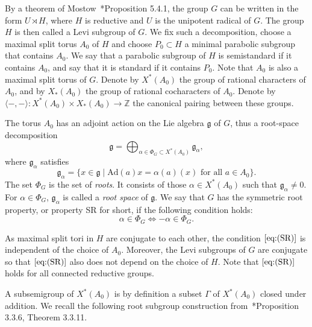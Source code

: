 \documentclass[letterpaper,11pt]{amsart}
\newcommand{\fg}{\mathfrak{g}}
\newcommand{\Z}{\mathbb{Z}}
\newcommand{\<}{\negthickspace}
\theoremstyle{definition}
\theoremstyle{plain}
\theoremstyle{remark}
\numberwithin{equation}{section}
\begin{document}
By a theorem of Mostow~\cite{Conrad}*{Proposition 5.4.1}, the group $G$ can
be written in the form $ U \rtimes H$, where $H$ is reductive and $U$ is the
unipotent radical of $G$. The group $H$ is then called a Levi subgroup of $G$. We fix such a decomposition, choose a maximal split
torus $A_0$ of $H$ and choose $P_0 \subset H$ a minimal parabolic subgroup
that contains $A_0$. We say that a parabolic subgroup of $H$ is semistandard if it
contains $A_0$, and say that it is standard if it contains $P_0$. Note that $A_0$ is
also a maximal split torus of $G$. Denote by $X^*(A_0)$ the group of rational characters of $A_0$, and by $X_*(A_0)$ the group of rational cocharacters of $A_0$. Denote by $\langle -,- \rangle : X^*(A_0) \times X_*(A_0) \to \Z$ the canonical pairing between these groups.

The torus $A_0$ has an adjoint action on the Lie algebra $\fg$ of $G$, thus a
root-space decomposition
    \[
    \fg =
    \bigoplus_{\alpha \in \Phi_G \subset X^*(A_0)} \fg_\alpha,
    \]
where $\fg_\alpha$ satisfies
    \[
    \fg_\alpha = \{ x \in \fg \mid \mathrm{Ad}(a) x
    = \alpha(a)(x) \text{ for all }a \in A_0 \}.
    \]
The set $\Phi_G$ is the set of \emph{roots}. It consists of those $\alpha \in X^*(A_0)$ such that $\fg_\alpha
\ne 0$. For $\alpha \in \Phi_G$, $\fg_\alpha$ is called a \emph{root space} of $\fg$. We say that $G$ has the symmetric root property, or property SR for short, if
the following condition holds:
    \begin{equation} \tag{SR} \label{eq:(SR)}
         \alpha \in \Phi_G  \iff -\alpha \in \Phi_G.
    \end{equation}

As maximal split tori in $H$ are conjugate to each other, the condition
$\eqref{eq:(SR)}$ is independent of the choice of $A_0$. Moreover, the Levi subgroups of $G$ are conjugate so that $\eqref{eq:(SR)}$ also does not depend on the choice of $H$. Note that $\eqref{eq:(SR)}$ holds for all connected reductive groups.

A subsemigroup of $X^*(A_0)$ is by definition a subset $\Gamma$ of $X^*(A_0)$ closed under
addition. We recall the following root subgroup construction
from~\cite{CGP}*{Proposition 3.3.6, Theorem 3.3.11}.
\end{document}
